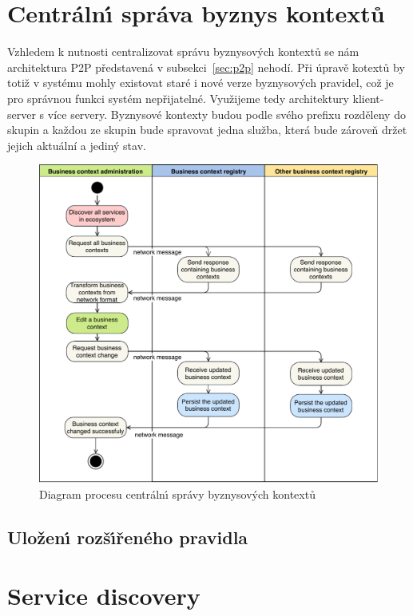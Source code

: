 \section{Centráln\'{\i} správa byznys kontextů}

Vzhledem k nutnosti centralizovat správu byznysových kontextů se nám
architektura \gls{P2P} představená v subsekci~\ref{sec:p2p} nehodí.
Při úpravě kotextů by totiž v systému mohly existovat staré i nové verze
byznysových pravidel, což je pro správnou funkci systém nepřijatelné.
Využijeme tedy architektury klient-server s více servery.
Byznysové kontexty budou podle svého prefixu rozděleny do skupin
a každou ze skupin bude spravovat jedna služba, která bude zároveň
držet jejich aktuální a jediný stav.

\begin{figure}
    \centering
    \includegraphics[keepaspectratio=true, width=0.8\linewidth]{figures/business-context-management.pdf}
    \caption{Diagram procesu centráln\'{\i} správy byznysov\'ych kontextů}
    \label{fig:business-context-management}
\end{figure} %

\subsection{Uložen\'{\i} rozš\'{\i}řeného pravidla}


\section{Service discovery}



